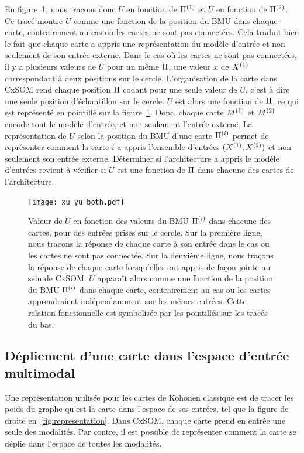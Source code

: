 En figure~\ref{fig:piu}, nous tracons donc $U$ en fonction de $\Pi^{({1})}$ et $U$ en fonction de $\Pi^{({2})}$.
Ce tracé montre $U$ comme une fonction de la position du BMU dans chaque carte, contrairement au cas ou les cartes ne sont pas connectées. Cela traduit bien le fait que chaque carte a appris une représentation du modèle d'entrée et non seulement de son entrée externe.
Dans le cas où les cartes ne sont pas connectées, il y a plusieurs valeurs de $U$ pour un même $\Pi$, une valeur $x$ de $X^{({1})}$ correspondant à deux positions sur le cercle.
L'organisation de la carte dans CxSOM rend chaque position $\Pi$ codant pour une seule valeur de $U$, c'est à dire une seule position d'échantillon sur le cercle. $U$ est alors une fonction de $\Pi$, ce qui est représenté en pointillé sur la figure~\ref{fig:piu}. Donc, chaque carte $M^{({1})}$ et $M^{({2})}$ encode tout le modèle d'entrée, et non seulement l'entrée externe.
La représentation de $U$ selon la position du BMU d'une carte $\Pi^{({i})}$ permet de représenter comment la carte $i$ a appris l'ensemble d'entrées $(X^{({1})},X^{({2})})$ et non seulement son entrée externe. Déterminer si l'architecture a appris le modèle d'entrées revient à vérifier si $U$ est une fonction de $\Pi$ dans chacune des cartes de l'architecture.
 
\begin{figure}
\centering
\texttt{[image: xu\_yu\_both.pdf]}
\caption{Valeur de $U$ en fonction des valeurs du BMU $\Pi^{({i})}$ dans chacune des cartes, pour des entrées prises sur le cercle. Sur la première ligne, nous tracons la réponse de chaque carte à son entrée dans le cas ou les cartes ne sont pas connectée. Sur la deuxième ligne, nous traçons la réponse de chaque carte lorsqu'elles ont appris de façon jointe au sein de CxSOM.
$U$ apparaît alors comme une fonction de la position du BMU $\Pi^{({i})}$ dans chaque carte, contrairement au cas ou les cartes apprendraient indépendamment sur les mêmes entrées. Cette relation fonctionnelle est symbolisée par les pointillés sur les tracés du bas.}
\label{fig:piu}
\end{figure}


\subsection{Dépliement d'une carte dans l'espace d'entrée multimodal}

Une représentation utilisée pour les cartes de Kohonen classique est de tracer les poids du graphe qu'est la carte dans l'espace de ses entrées, tel que la figure de droite en~\ref{fig:representation}. Dans CxSOM, chaque carte prend en entrée une seule des modalités. Par contre, il est possible de représenter comment la carte se déplie dans l'espace de toutes les modalités.

